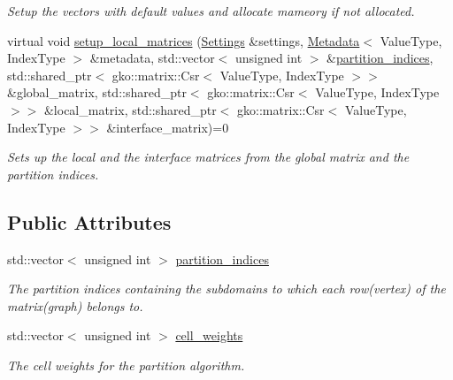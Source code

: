 \begin{DoxyCompactItemize}
\begin{DoxyCompactList}\small\item\em Setup the vectors with default values and allocate mameory if not allocated. \end{DoxyCompactList}\item 
virtual void \hyperlink{classschwz_1_1Initialize_ad24764a4ded54c2af6a5111ba8c8228f}{setup\+\_\+local\+\_\+matrices} (\hyperlink{structschwz_1_1Settings}{Settings} \&settings, \hyperlink{structschwz_1_1Metadata}{Metadata}$<$ Value\+Type, Index\+Type $>$ \&metadata, std\+::vector$<$ unsigned int $>$ \&\hyperlink{classschwz_1_1Initialize_a007426e21221298b6dca9b7c9fbd1c10}{partition\+\_\+indices}, std\+::shared\+\_\+ptr$<$ gko\+::matrix\+::\+Csr$<$ Value\+Type, Index\+Type $>$$>$ \&global\+\_\+matrix, std\+::shared\+\_\+ptr$<$ gko\+::matrix\+::\+Csr$<$ Value\+Type, Index\+Type $>$$>$ \&local\+\_\+matrix, std\+::shared\+\_\+ptr$<$ gko\+::matrix\+::\+Csr$<$ Value\+Type, Index\+Type $>$$>$ \&interface\+\_\+matrix)=0
\begin{DoxyCompactList}\small\item\em Sets up the local and the interface matrices from the global matrix and the partition indices. \end{DoxyCompactList}\end{DoxyCompactItemize}
\subsection*{Public Attributes}
\begin{DoxyCompactItemize}
\item 
\mbox{\label{classschwz_1_1Initialize_a007426e21221298b6dca9b7c9fbd1c10}} 
std\+::vector$<$ unsigned int $>$ \hyperlink{classschwz_1_1Initialize_a007426e21221298b6dca9b7c9fbd1c10}{partition\+\_\+indices}
\begin{DoxyCompactList}\small\item\em The partition indices containing the subdomains to which each row(vertex) of the matrix(graph) belongs to. \end{DoxyCompactList}\item 
\mbox{\label{classschwz_1_1Initialize_a715b9e3a552f77277492d1c86c600681}} 
std\+::vector$<$ unsigned int $>$ \hyperlink{classschwz_1_1Initialize_a715b9e3a552f77277492d1c86c600681}{cell\+\_\+weights}
\begin{DoxyCompactList}\small\item\em The cell weights for the partition algorithm. \end{DoxyCompactList}\end{DoxyCompactItemize}
